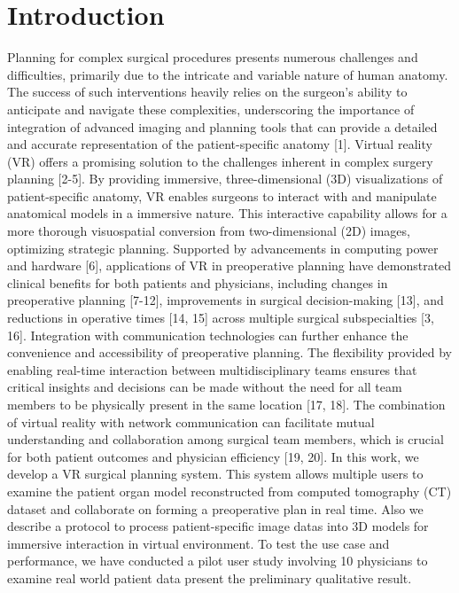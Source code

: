 \documentclass{bmcart}
\begin{document}
\section{Introduction}
Planning for complex surgical procedures presents numerous challenges and difficulties, primarily due to the intricate and variable nature of human anatomy. The success of such interventions heavily relies on the surgeon's ability to anticipate and navigate these complexities, underscoring the importance of integration of advanced imaging and planning tools that can provide a detailed and accurate representation of the patient-specific anatomy [1].
Virtual reality (VR) offers a promising solution to the challenges inherent in complex surgery planning [2-5]. By providing immersive, three-dimensional (3D) visualizations of patient-specific anatomy, VR enables surgeons to interact with and manipulate anatomical models in a immersive nature. This interactive capability allows for a more thorough visuospatial conversion from two-dimensional (2D) images, optimizing strategic planning. Supported by advancements in computing power and hardware [6], applications of VR in preoperative planning have demonstrated clinical benefits for both patients and physicians, including changes in preoperative planning [7-12], improvements in surgical decision-making [13], and reductions in operative times [14, 15] across multiple surgical subspecialties [3, 16].
Integration with communication technologies can further enhance the convenience and accessibility of preoperative planning. The flexibility provided by enabling real-time interaction between multidisciplinary teams ensures that critical insights and decisions can be made without the need for all team members to be physically present in the same location [17, 18]. The combination of virtual reality with network communication can facilitate mutual understanding and collaboration among surgical team members, which is crucial for both patient outcomes and physician efficiency [19, 20].
In this work, we develop a VR surgical planning system. This system allows multiple users to examine the patient organ model reconstructed from computed tomography (CT) dataset and collaborate on forming a preoperative plan in real time. Also we describe a protocol to process patient-specific image datas into 3D models for immersive interaction in virtual environment. To test the use case and performance, we have conducted a pilot user study involving 10 physicians to examine real world patient data present the preliminary qualitative result.  
 
\end{document}

